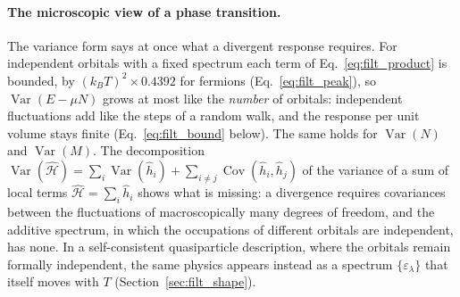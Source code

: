 \documentclass[10pt,a4paper]{article}
\theoremstyle{plain}
\theoremstyle{remark}
\newcommand{\Var}{\operatorname{Var}}
\newcommand{\Cov}{\operatorname{Cov}}
\begin{document}
\paragraph{The microscopic view of a phase transition.} The variance form says at
once what a divergent response requires. For independent orbitals with a fixed
spectrum each term of Eq.~\eqref{eq:filt_product} is bounded, by
$ (k_BT)^{2}\times0.4392 $ for fermions (Eq.~\eqref{eq:filt_peak}), so
$ \Var(E - \mu N) $ grows at most like the \emph{number} of orbitals: independent
fluctuations add like the steps of a random walk, and the response per unit volume
stays finite (Eq.~\eqref{eq:filt_bound} below). The same holds for $ \Var(N) $ and
$ \Var(M) $. The decomposition
$\Var(\hat{\mathcal H})=\sum_i\Var(\hat h_i)+\sum_{i\neq j}\Cov(\hat h_i,\hat h_j)$
of the variance of a sum of local terms $\hat{\mathcal H}=\sum_i\hat h_i$
shows what is missing: a divergence requires covariances between
the fluctuations of macroscopically many degrees of freedom, and the additive
spectrum, in which the occupations of different orbitals are independent, has none.
In a self-consistent quasiparticle description, where the orbitals remain formally
independent, the same physics appears instead as a spectrum
$ \{\varepsilon_\lambda\} $ that itself moves with $ T $ (Section~\ref{sec:filt_shape}).
\end{document}
